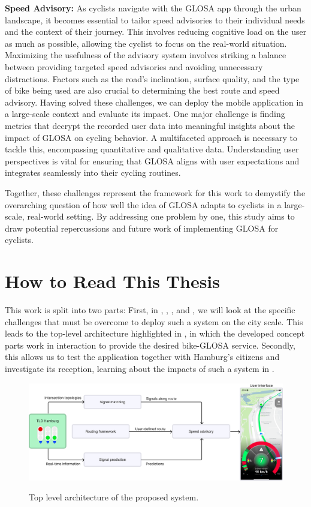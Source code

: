 \textbf{Speed Advisory:} As cyclists navigate with the GLOSA app through the urban landscape, it becomes essential to tailor speed advisories to their individual needs and the context of their journey. This involves reducing cognitive load on the user as much as possible, allowing the cyclist to focus on the real-world situation. Maximizing the usefulness of the advisory system involves striking a balance between providing targeted speed advisories and avoiding unnecessary distractions. Factors such as the road's inclination, surface quality, and the type of bike being used are also crucial to determining the best route and speed advisory. Having solved these challenges, we can deploy the mobile application in a large-scale context and evaluate its impact. One major challenge is finding metrics that decrypt the recorded user data into meaningful insights about the impact of GLOSA on cycling behavior. A multifaceted approach is necessary to tackle this, encompassing quantitative and qualitative data. Understanding user perspectives is vital for ensuring that GLOSA aligns with user expectations and integrates seamlessly into their cycling routines. 

Together, these challenges represent the framework for this work to demystify the overarching question of how well the idea of GLOSA adapts to cyclists in a large-scale, real-world setting. By addressing one problem by one, this study aims to draw potential repercussions and future work of implementing GLOSA for cyclists.

\section{How to Read This Thesis}

This work is split into two parts: First, in , , , and , we will look at the specific challenges that must be overcome to deploy such a system on the city scale. This leads to the top-level architecture highlighted in , in which the developed concept parts work in interaction to provide the desired bike-GLOSA service. Secondly, this allows us to test the application together with Hamburg's citizens and investigate its reception, learning about the impacts of such a system in .

\begin{figure}[h]
  \caption{Top level architecture of the proposed system.}
  \includegraphics[width=\linewidth]{images/outline.png}
  \label{fig:outline}
\end{figure}

